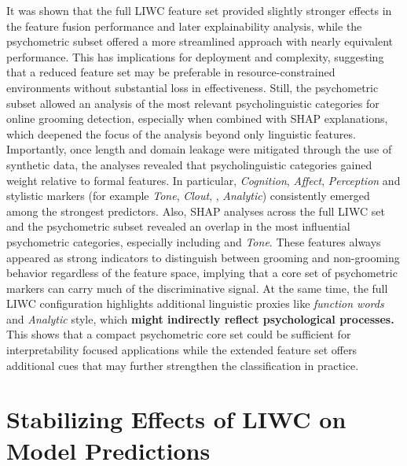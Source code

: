 It was shown that the full LIWC feature set provided slightly stronger effects in the feature fusion performance and later explainability analysis, while the psychometric subset offered a more streamlined approach with nearly equivalent performance. This has implications for deployment and complexity, suggesting that a reduced feature set may be preferable in resource-constrained environments without substantial loss in effectiveness. Still, the psychometric subset allowed an analysis of the most relevant psycholinguistic categories for online grooming detection, especially when combined with SHAP explanations, which deepened the focus of the analysis beyond only linguistic features. Importantly, once length and domain leakage were mitigated through the use of synthetic data, the analyses revealed that psycholinguistic categories gained weight relative to formal features. In particular, \textit{Cognition}, \textit{Affect}, \textit{Perception} and stylistic markers (for example \textit{Tone}, \textit{Clout}, , \textit{Analytic}) consistently emerged among the strongest predictors. Also, SHAP analyses across the full LIWC set and the psychometric subset revealed an overlap in the most influential psychometric categories, especially including  and \textit{Tone}. These features always appeared as strong indicators to distinguish between grooming and non-grooming behavior regardless of the feature space, implying that a core set of psychometric markers can carry much of the discriminative signal. At the same time, the full LIWC configuration highlights additional linguistic proxies like \textit{function words} and \textit{Analytic} style, which \textbf{might indirectly reflect psychological processes.} This shows that a compact psychometric core set could be sufficient for interpretability focused applications while the extended feature set offers additional cues that may further strengthen the classification in practice.
\section{Stabilizing Effects of LIWC on Model Predictions}

